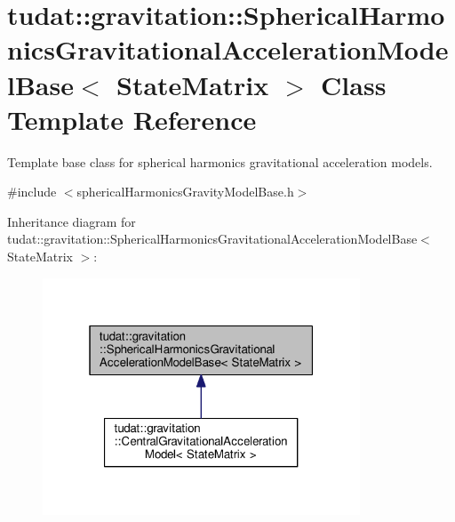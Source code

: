 \hypertarget{classtudat_1_1gravitation_1_1SphericalHarmonicsGravitationalAccelerationModelBase}{}\section{tudat\+:\+:gravitation\+:\+:Spherical\+Harmonics\+Gravitational\+Acceleration\+Model\+Base$<$ State\+Matrix $>$ Class Template Reference}
\label{classtudat_1_1gravitation_1_1SphericalHarmonicsGravitationalAccelerationModelBase}


Template base class for spherical harmonics gravitational acceleration models.  




{\ttfamily \#include $<$spherical\+Harmonics\+Gravity\+Model\+Base.\+h$>$}



Inheritance diagram for tudat\+:\+:gravitation\+:\+:Spherical\+Harmonics\+Gravitational\+Acceleration\+Model\+Base$<$ State\+Matrix $>$\+:
\nopagebreak
\begin{figure}[H]
\begin{center}
\leavevmode
\includegraphics[width=268pt]{classtudat_1_1gravitation_1_1SphericalHarmonicsGravitationalAccelerationModelBase__inherit__graph}
\end{center}
\end{figure}


